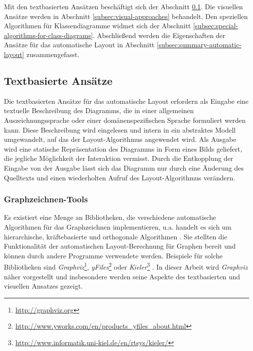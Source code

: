 Mit den textbasierten Ansätzen beschäftigt sich der Abschnitt \ref{subsec:text-based-approaches}. Die visuellen Ansätze werden in Abschnitt \ref{subsec:visual-approaches} behandelt. Den speziellen Algorithmen für Klassendiagramme widmet sich der Abschnitt \ref{subsec:special-algorithms-for-class-diagrams}. Abschließend werden die Eigenschaften der Ansätze für das automatische Layout in Abschnitt \ref{subsec:summary-automatic-layout} zusammengefasst.

\subsection{Textbasierte Ansätze}
\label{subsec:text-based-approaches}

Die textbasierten Ansätze für das automatische Layout erfordern als Eingabe eine textuelle Beschreibung des Diagramms, die in einer allgemeinen Auszeichnungssprache oder einer domänenspezifischen Sprache formuliert werden kann. Diese Beschreibung wird eingelesen und intern in ein abstraktes Modell umgewandelt, auf das der Layout-Algorithmus angewendet wird. Als Ausgabe wird eine statische Repräsentation des Diagramms in Form eines Bilds geliefert, die jegliche Möglichkeit der Interaktion vermisst. Durch die Entkopplung der Eingabe von der Ausgabe lässt sich das Diagramm nur durch eine Änderung des Quelltexts und einen wiederholten Aufruf des Layout-Algorithmus verändern.

\subsubsection{Graphzeichnen-Tools}
\label{subsubsec:graph-drawing-tools}

Es existiert eine Menge an Bibliotheken, die verschiedene automatische Algorithmen für das Graphzeichnen implementieren, u.a. handelt es sich um hierarchische, kräftebasierte und orthogonale Algorithmen \cite{Maier12A-Pattern-based}. Sie stellten die Funktionalität der automatischen Layout-Be\-rech\-nung für Graphen bereit und können durch andere Programme verwendete werden.  Beispiele für solche Bibliotheken sind \textit{Graphviz}\footnote{\url{http://graphviz.org}}, \textit{yFiles}\footnote{\url{http://www.yworks.com/en/products_yfiles_about.html}} oder \textit{Kieler}\footnote{\url{http://www.informatik.uni-kiel.de/en/rtsys/kieler/}} \cite{Maier12A-Pattern-based}. In dieser Arbeit wird \textit{Graphviz} näher vorgestellt und insbesondere werden seine Aspekte des textbasierten und visuellen Ansatzes gezeigt.

